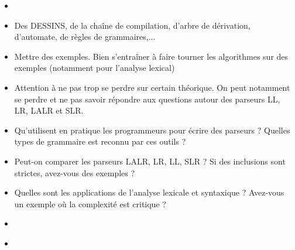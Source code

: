 \documentclass{agregfiche}
\begin{document}
\secidees

\begin{itemize}
	\item 
\end{itemize}

\secpieges

\begin{itemize}
    \item Des DESSINS, de la chaîne de compilation, d'arbre de dérivation, d'automate, de règles de grammaires,...
    \item Mettre des exemples. Bien s'entraîner à faire tourner les algorithmes sur des exemples (notamment pour l'analyse lexical)
	\item Attention à ne pas trop se perdre sur certain théorique. On peut notamment se perdre et ne pas savoir répondre aux questions autour des parseurs LL, LR, LALR et SLR.

\end{itemize}

\secquestionsclassiques

\begin{itemize}
	\item Qu'utilisent en pratique les programmeurs pour écrire des parseurs ? Quelles types de grammaire est reconnu par ces outils ?
\item Peut-on comparer les parseurs LALR, LR, LL, SLR ? Si  des inclusions sont strictes, avez-vous des exemples ?
\item Quelles sont les applications de l'analyse lexicale et syntaxique ? Avez-vous un exemple où la complexité est critique ?
\end{itemize}

\secreferences

\begin{itemize}
\item 
\end{itemize}

\secdev

\begin{itemize}
\item 
\end{itemize}
\end{document}
